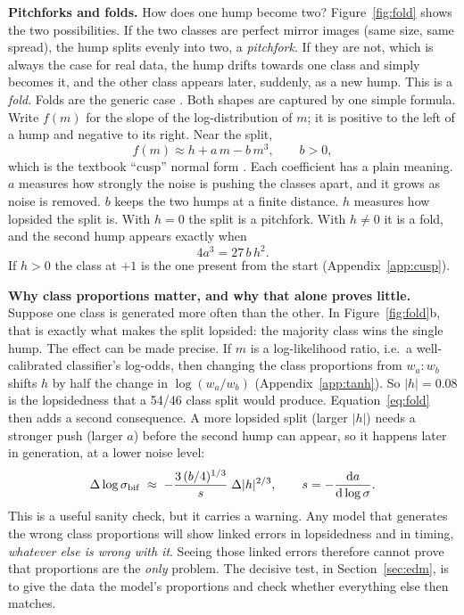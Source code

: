 \documentclass[11pt]{article}
\newcommand{\para}[1]{\textbf{#1}\hspace{0.6em}}
\newcommand{\sbif}{\sigma_{\rm bif}}
\begin{document}
\para{Pitchforks and folds.}
How does one hump become two? Figure~\ref{fig:fold} shows the two possibilities. If the two classes are perfect mirror images (same size, same spread), the hump splits evenly into two, a \emph{pitchfork}. If they are not, which is always the case for real data, the hump drifts towards one class and simply becomes it, and the other class appears later, suddenly, as a new hump. This is a \emph{fold}. Folds are the generic case \citep{stancevic2026information,achilli2026theory,marta2026speciation}. Both shapes are captured by one simple formula. Write $f(m)$ for the slope of the log-distribution of $m$; it is positive to the left of a hump and negative to its right. Near the split,
\begin{equation}
f(m)\approx h+a\,m-b\,m^3,\qquad b>0,
\label{eq:cusp}
\end{equation}
which is the textbook ``cusp'' normal form \citep{golubitsky1985singularities,strogatz2018nonlinear}. Each coefficient has a plain meaning. $a$ measures how strongly the noise is pushing the classes apart, and it grows as noise is removed. $b$ keeps the two humps at a finite distance. $h$ measures how lopsided the split is. With $h=0$ the split is a pitchfork. With $h\ne0$ it is a fold, and the second hump appears exactly when
\begin{equation}
4a^3=27\,b\,h^2.
\label{eq:fold}
\end{equation}
If $h>0$ the class at $+1$ is the one present from the start (Appendix~\ref{app:cusp}).

\para{Why class proportions matter, and why that alone proves little.}
Suppose one class is generated more often than the other. In Figure~\ref{fig:fold}b, that is exactly what makes the split lopsided: the majority class wins the single hump. The effect can be made precise. If $m$ is a log-likelihood ratio, i.e.\ a well-calibrated classifier's log-odds, then changing the class proportions from $w_a{:}w_b$ shifts $h$ by half the change in $\log(w_a/w_b)$ (Appendix~\ref{app:tanh}). So $|h|=0.08$ is the lopsidedness that a 54/46 class split would produce. Equation~\eqref{eq:fold} then adds a second consequence. A more lopsided split (larger $|h|$) needs a stronger push (larger $a$) before the second hump can appear, so it happens later in generation, at a lower noise level:
\begin{equation}
\Delta\log\sbif\;\approx\;-\frac{3\,(b/4)^{1/3}}{s}\;\Delta|h|^{2/3},\qquad s=-\frac{\mathrm da}{\mathrm d\log\sigma}.
\label{eq:shift}
\end{equation}
This is a useful sanity check, but it carries a warning. Any model that generates the wrong class proportions will show linked errors in lopsidedness and in timing, \emph{whatever else is wrong with it}. Seeing those linked errors therefore cannot prove that proportions are the \emph{only} problem. The decisive test, in Section~\ref{sec:edm}, is to give the data the model's proportions and check whether everything else then matches.
\end{document}
